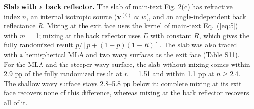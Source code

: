 \documentclass[10pt]{article}
\begin{document}
\textbf{Slab with a back reflector.} The slab of main-text Fig. 2(c) has refractive index $n$, an internal isotropic source ($\mathbf{v}^{(0)} \propto w$), and an angle-independent back reflectance $R$. Mixing at the exit face uses the kernel of main-text Eq.~(\ref{eq:5}) with $m$ = 1; mixing at the back reflector uses $D$ with constant $R$, which gives the fully randomized result $p/[p+(1-p)(1-R)]$. The slab was also traced with a hemispherical MLA and two wavy surfaces as the exit face (Table S11). For the MLA and the steeper wavy surface, the slab without mixing comes within 2.9 pp of the fully randomized result at $n$ = 1.51 and within 1.1 pp at $n \ge 2.4$. The shallow wavy surface stays 2.8–5.8 pp below it; complete mixing at its exit face recovers none of this difference, whereas mixing at the back reflector recovers all of it.
\end{document}

